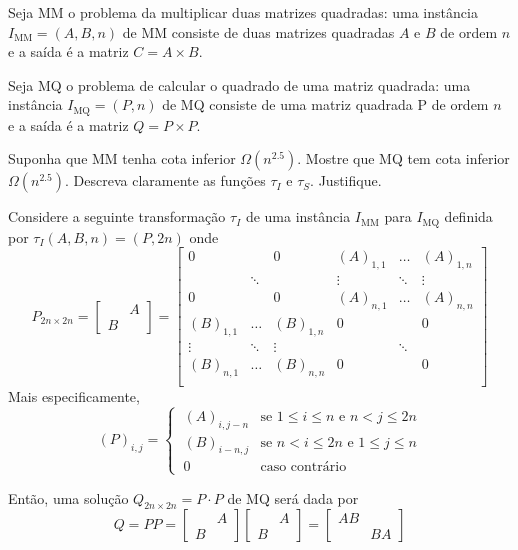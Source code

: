 Seja MM o problema da multiplicar duas matrizes quadradas: uma instância $I_\text{MM} = (A,B,n)$ de MM consiste de duas matrizes quadradas $A$ e $B$ de ordem $n$ e a saída é a matriz $C = A \times B$.

Seja MQ o problema de calcular o quadrado de uma matriz quadrada: uma instância $I_\text{MQ} = (P,n)$ de MQ consiste de uma matriz quadrada P de ordem $n$ e a saída é a matriz $Q = P \times P$.

Suponha que MM tenha cota inferior $\Omega\left(n^{2.5}\right)$. Mostre que MQ tem cota inferior $\Omega\left(n^{2.5}\right)$. Descreva claramente as funções $\tau_I$ e $\tau_S$. Justifique.

\itemdsep

Considere a seguinte transformação $\tau_I$ de uma instância $I_\text{MM}$ para $I_\text{MQ}$ definida por $\tau_I(A, B, n) = (P, 2n)$ onde
\[
    P_{2n \times 2n} = \begin{bmatrix} & A \\ B & \end{bmatrix}
    = \begin{bmatrix}
        0         &        & 0         & (A)_{1,1} & \dots  & (A)_{1,n} \\
                    & \ddots &           & \vdots    & \ddots & \vdots    \\
        0         &        & 0         & (A)_{n,1} & \dots  & (A)_{n,n} \\
        (B)_{1,1} & \dots  & (B)_{1,n} & 0         &        & 0         \\
        \vdots    & \ddots & \vdots    &           & \ddots &           \\
        (B)_{n,1} & \dots  & (B)_{n,n} & 0         &        & 0         \\
    \end{bmatrix}
\]
Mais especificamente,
\[
    (P)_{i,j} = \begin{cases}
        ~ (A)_{i,j-n} & \text{se $1 \leq i \leq n$ e $n < j \leq 2 n$} \\
        ~ (B)_{i-n,j} & \text{se $n < i \leq 2 n$ e $1 \leq j \leq n$}\\
        ~ 0 & \text{caso contrário}
    \end{cases}
\]

Então, uma solução $Q_{2n \times 2n} = P \cdot P$ de MQ será dada por
\[
    Q = P P
    = \begin{bmatrix} & A \\ B & \end{bmatrix} \begin{bmatrix} & A \\ B & \end{bmatrix}
    = \begin{bmatrix} A B & \\ & B A \end{bmatrix}
\]

